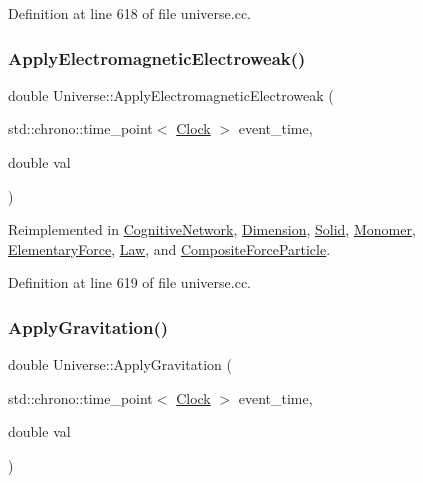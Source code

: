 Definition at line 618 of file universe.\+cc.

\mbox{\label{class_universe_a4c36c1ab30db993307f88363dde5e8c5}} 
\subsubsection{\texorpdfstring{Apply\+Electromagnetic\+Electroweak()}{ApplyElectromagneticElectroweak()}}
{\footnotesize\ttfamily double Universe\+::\+Apply\+Electromagnetic\+Electroweak (\begin{DoxyParamCaption}\item[{std\+::chrono\+::time\+\_\+point$<$ \mbox{\hyperlink{universe_8h_a0ef8d951d1ca5ab3cfaf7ab4c7a6fd80}{Clock}} $>$}]{event\+\_\+time,  }\item[{double}]{val }\end{DoxyParamCaption})\hspace{0.3cm}{\ttfamily [virtual]}}



Reimplemented in \mbox{\hyperlink{class_cognitive_network_a9753f52c9e36ad44e9fac1d3e38a0770}{Cognitive\+Network}}, \mbox{\hyperlink{class_dimension_ab13e8ed50a4373274636e542c917db01}{Dimension}}, \mbox{\hyperlink{class_solid_a46702e3109994b310eb4f1fba5610e0b}{Solid}}, \mbox{\hyperlink{class_monomer_a4c3f9894ea57047789bec32602f033cb}{Monomer}}, \mbox{\hyperlink{class_elementary_force_a3764a27b11760b6ead2c8a23ff25d77a}{Elementary\+Force}}, \mbox{\hyperlink{class_law_a4485046db890a95cea16573042a4f4f6}{Law}}, and \mbox{\hyperlink{class_composite_force_particle_a5f6aef9e15e2e5f346c7ede76ae6458b}{Composite\+Force\+Particle}}.



Definition at line 619 of file universe.\+cc.

\mbox{\label{class_universe_a76c0b5e63c2a7d1988c44db341c3d64c}} 
\subsubsection{\texorpdfstring{Apply\+Gravitation()}{ApplyGravitation()}}
{\footnotesize\ttfamily double Universe\+::\+Apply\+Gravitation (\begin{DoxyParamCaption}\item[{std\+::chrono\+::time\+\_\+point$<$ \mbox{\hyperlink{universe_8h_a0ef8d951d1ca5ab3cfaf7ab4c7a6fd80}{Clock}} $>$}]{event\+\_\+time,  }\item[{double}]{val }\end{DoxyParamCaption})\hspace{0.3cm}{\ttfamily [virtual]}}



